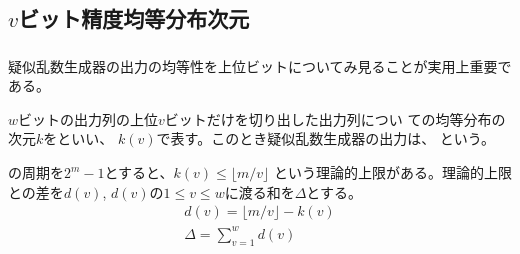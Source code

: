 \documentclass[cjk, dvips, handout, trans, xcolor=dvipsnames, hyperref={bookmarks=false}]{beamer}
\begin{document}
\subsection{$v$ビット精度均等分布次元}
\begin{frame}[t]
  \frametitle{\insertsubsection}

  疑似乱数生成器の出力の均等性を上位ビットについてみ見ることが実用上重要である。


  \pause
  \vspace{\baselineskip}
  $w$ビットの出力列の上位$v$ビットだけを切り出した出力列につい
  ての均等分布の次元$k$をといい、
  $k(v)$で表す。このとき疑似乱数生成器の出力は、
  という。

  \pause
  \vspace{\baselineskip}
  \FLPRNG の周期を$2^m-1$とすると、$k(v) \le \lfloor m/v \rfloor$
  という理論的上限がある。理論的上限との差を$d(v)$,
  $d(v)$の$1 \le v \le w$に渡る和を$\Delta$とする。
  \begin{gather*}
    d(v) = \lfloor m/v \rfloor - k(v)\\
    \Delta = \sum_{v = 1}^w d(v)
  \end{gather*}
\end{frame}
\end{document}
